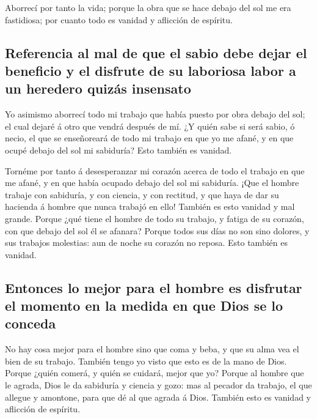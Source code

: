  Aborrecí por tanto la vida; porque la obra que se hace
debajo del sol me era fastidiosa; por cuanto todo es vanidad y aflicción
de espíritu.

\hypertarget{referencia-al-mal-de-que-el-sabio-debe-dejar-el-beneficio-y-el-disfrute-de-su-laboriosa-labor-a-un-heredero-quizuxe1s-insensato}{%
\subsection{Referencia al mal de que el sabio debe dejar el beneficio y
el disfrute de su laboriosa labor a un heredero quizás
insensato}\label{referencia-al-mal-de-que-el-sabio-debe-dejar-el-beneficio-y-el-disfrute-de-su-laboriosa-labor-a-un-heredero-quizuxe1s-insensato}}

 Yo asimismo aborrecí todo mi trabajo que había puesto
por obra debajo del sol; el cual dejaré á otro que vendrá después de mí.
 ¿Y quién sabe si será sabio, ó necio, el que se
enseñoreará de todo mi trabajo en que yo me afané, y en que ocupé debajo
del sol mi sabiduría? Esto también es vanidad.

 Tornéme por tanto á desesperanzar mi corazón acerca de
todo el trabajo en que me afané, y en que había ocupado debajo del sol
mi sabiduría.  ¡Que el hombre trabaje con sabiduría, y
con ciencia, y con rectitud, y que haya de dar su hacienda á hombre que
nunca trabajó en ello! También es esto vanidad y mal grande.
 Porque ¿qué tiene el hombre de todo su trabajo, y fatiga
de su corazón, con que debajo del sol él se afanara? 
Porque todos sus días no son sino dolores, y sus trabajos molestias: aun
de noche su corazón no reposa. Esto también es vanidad.

\hypertarget{entonces-lo-mejor-para-el-hombre-es-disfrutar-el-momento-en-la-medida-en-que-dios-se-lo-conceda}{%
\subsection{Entonces lo mejor para el hombre es disfrutar el momento en
la medida en que Dios se lo
conceda}\label{entonces-lo-mejor-para-el-hombre-es-disfrutar-el-momento-en-la-medida-en-que-dios-se-lo-conceda}}

 No hay cosa mejor para el hombre sino que coma y beba, y
que su alma vea el bien de su trabajo. También tengo yo visto que esto
es de la mano de Dios.  Porque ¿quién comerá, y quién se
cuidará, mejor que yo?  Porque al hombre que le agrada,
Dios le da sabiduría y ciencia y gozo: mas al pecador da trabajo, el que
allegue y amontone, para que dé al que agrada á Dios. También esto es
vanidad y aflicción de espíritu.

